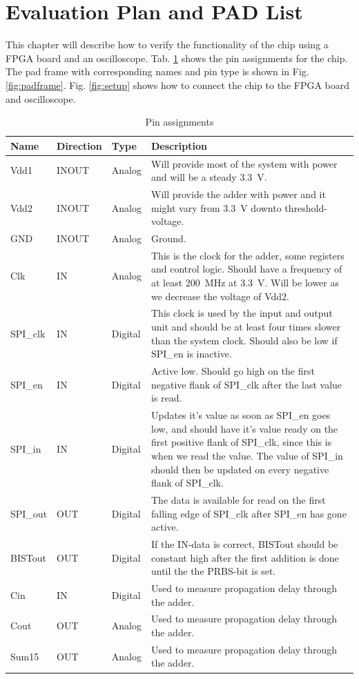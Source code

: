 \section{Evaluation Plan and PAD List}
This chapter will describe how to verify the functionality of the chip using a FPGA board and an oscilloscope.
Tab. \ref{tab:pins} shows the pin assignments for the chip. The pad frame with corresponding names and pin type is shown in Fig. \ref{fig:padframe}. Fig. \ref{fig:setup} shows how to connect the chip to the FPGA board and oscilloscope.

\begin{table}[H]
  \caption{Pin assignments}
  \centering
  \begin{tabularx}{\linewidth}{|l|l|l|X|}
    \hline
    \textbf{Name} & \textbf{Direction} & \textbf{Type} & \textbf{Description} \\ \hline
    Vdd1 & INOUT & Analog & Will provide most of the system with power and will be a steady \SI{3.3}{\volt}. \\ \hline
    Vdd2 & INOUT & Analog & Will provide the adder with power and it might vary from \SI{3.3}{\volt} downto threshold-voltage. \\ \hline
    GND &  INOUT & Analog & Ground. \\ \hline
    Clk & IN & Analog & This is the clock for the adder, some registers and control logic. Should have a frequency of at least \SI{200}{\mega\hertz} at \SI{3.3}{\volt}. Will be lower as we decrease the voltage of Vdd2. \\ \hline
    SPI\_clk & IN & Digital & This clock is used by the input and output unit and should be at least four times slower than the system clock. Should also be low if SPI\_en is inactive. \\ \hline
    SPI\_en & IN & Digital & Active low. Should go high on the first negative flank of SPI\_clk after the last value is read. \\ \hline
    SPI\_in & IN & Digital & Updates it's value as soon as SPI\_en goes low, and should have it's value ready on the first positive flank of SPI\_clk, since this is when we read the value. The value of SPI\_in should then be updated on every negative flank of SPI\_clk. \\ \hline
    SPI\_out & OUT & Digital & The data is available for read on the first falling edge of SPI\_clk after SPI\_en has gone active. \\ \hline
    BISTout & OUT & Digital & If the IN-data is correct, BISTout should be constant high after the first addition is done until the the PRBS-bit is set.  \\ \hline
    Cin & IN & Digital & Used to measure propagation delay through the adder. \\ \hline
    Cout & OUT & Analog & Used to measure propagation delay through the adder. \\ \hline
    Sum15 & OUT & Analog & Used to measure propagation delay through the adder. \\ \hline
  \end{tabularx}
  \label{tab:pins}
\end{table}


